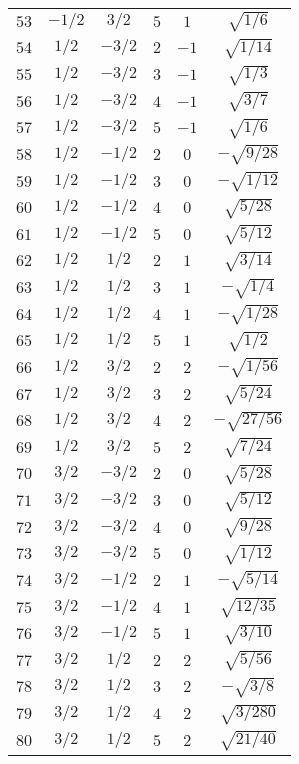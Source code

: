 \begin{table}
\begin{center}
\begin{tabular}{|c|c|c|c|c|c|}
$53$ & $-1/2$ & $3/2$ & $5$ & $1$ & $\sqrt{1/6}$ \\ 
$54$ & $1/2$ & $-3/2$ & $2$ & $-1$ & $\sqrt{1/14}$ \\ 
$55$ & $1/2$ & $-3/2$ & $3$ & $-1$ & $\sqrt{1/3}$ \\ 
$56$ & $1/2$ & $-3/2$ & $4$ & $-1$ & $\sqrt{3/7}$ \\ 
$57$ & $1/2$ & $-3/2$ & $5$ & $-1$ & $\sqrt{1/6}$ \\ 
$58$ & $1/2$ & $-1/2$ & $2$ & $0$ & $-\sqrt{9/28}$ \\ 
$59$ & $1/2$ & $-1/2$ & $3$ & $0$ & $-\sqrt{1/12}$ \\ 
$60$ & $1/2$ & $-1/2$ & $4$ & $0$ & $\sqrt{5/28}$ \\ 
$61$ & $1/2$ & $-1/2$ & $5$ & $0$ & $\sqrt{5/12}$ \\ 
$62$ & $1/2$ & $1/2$ & $2$ & $1$ & $\sqrt{3/14}$ \\ 
$63$ & $1/2$ & $1/2$ & $3$ & $1$ & $-\sqrt{1/4}$ \\ 
$64$ & $1/2$ & $1/2$ & $4$ & $1$ & $-\sqrt{1/28}$ \\ 
$65$ & $1/2$ & $1/2$ & $5$ & $1$ & $\sqrt{1/2}$ \\ 
$66$ & $1/2$ & $3/2$ & $2$ & $2$ & $-\sqrt{1/56}$ \\ 
$67$ & $1/2$ & $3/2$ & $3$ & $2$ & $\sqrt{5/24}$ \\ 
$68$ & $1/2$ & $3/2$ & $4$ & $2$ & $-\sqrt{27/56}$ \\ 
$69$ & $1/2$ & $3/2$ & $5$ & $2$ & $\sqrt{7/24}$ \\ 
$70$ & $3/2$ & $-3/2$ & $2$ & $0$ & $\sqrt{5/28}$ \\ 
$71$ & $3/2$ & $-3/2$ & $3$ & $0$ & $\sqrt{5/12}$ \\ 
$72$ & $3/2$ & $-3/2$ & $4$ & $0$ & $\sqrt{9/28}$ \\ 
$73$ & $3/2$ & $-3/2$ & $5$ & $0$ & $\sqrt{1/12}$ \\ 
$74$ & $3/2$ & $-1/2$ & $2$ & $1$ & $-\sqrt{5/14}$ \\ 
$75$ & $3/2$ & $-1/2$ & $4$ & $1$ & $\sqrt{12/35}$ \\ 
$76$ & $3/2$ & $-1/2$ & $5$ & $1$ & $\sqrt{3/10}$ \\ 
$77$ & $3/2$ & $1/2$ & $2$ & $2$ & $\sqrt{5/56}$ \\ 
$78$ & $3/2$ & $1/2$ & $3$ & $2$ & $-\sqrt{3/8}$ \\ 
$79$ & $3/2$ & $1/2$ & $4$ & $2$ & $\sqrt{3/280}$ \\ 
$80$ & $3/2$ & $1/2$ & $5$ & $2$ & $\sqrt{21/40}$ \\ 

\end{tabular}
\end{center}
\end{table}
